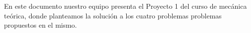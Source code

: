 
\noindent 				%
En este documento nuestro equipo presenta el Proyecto 1 del curso de mecánica teórica, 
donde planteamos la solución a los cuatro problemas problemas propuestos en el mismo.